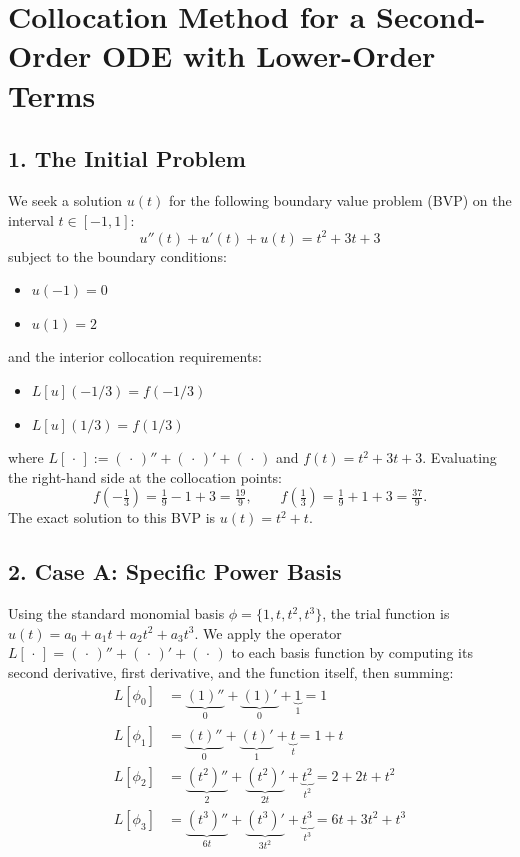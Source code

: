 \documentclass{article}
\begin{document}
\section*{Collocation Method for a Second-Order ODE with Lower-Order Terms}

\subsection*{1. The Initial Problem}
We seek a solution $u(t)$ for the following boundary value problem (BVP) on the interval $t \in [-1, 1]$:
\begin{equation}
    u''(t) + u'(t) + u(t) = t^2 + 3t + 3
\end{equation}
subject to the boundary conditions:
\begin{itemize}
    \item $u(-1) = 0$
    \item $u(1) = 2$
\end{itemize}
and the interior collocation requirements:
\begin{itemize}
    \item $L[u](-1/3) = f(-1/3)$
    \item $L[u](1/3) = f(1/3)$
\end{itemize}
where $L[\,\cdot\,] := (\,\cdot\,)'' + (\,\cdot\,)' + (\,\cdot\,)$ and $f(t) = t^2 + 3t + 3$.  Evaluating
the right-hand side at the collocation points:
\begin{equation}
    f\!\left(-\tfrac{1}{3}\right) = \tfrac{1}{9} - 1 + 3 = \tfrac{19}{9}, \qquad
    f\!\left(\tfrac{1}{3}\right)  = \tfrac{1}{9} + 1 + 3 = \tfrac{37}{9}.
\end{equation}
The exact solution to this BVP is $u(t) = t^2 + t$.

\subsection*{2. Case A: Specific Power Basis}
Using the standard monomial basis $\phi = \{1, t, t^2, t^3\}$, the trial function is
$u(t) = a_0 + a_1 t + a_2 t^2 + a_3 t^3$.
We apply the operator $L[\,\cdot\,] = (\,\cdot\,)'' + (\,\cdot\,)' + (\,\cdot\,)$ to each basis
function by computing its second derivative, first derivative, and the function itself, then summing:
\begin{align*}
    L[\phi_0]
        &= \underbrace{(1)''}_0 + \underbrace{(1)'}_0 + \underbrace{1}_{1}
         = 1 \\[4pt]
    L[\phi_1]
        &= \underbrace{(t)''}_0 + \underbrace{(t)'}_{1} + \underbrace{t}_{t}
         = 1 + t \\[4pt]
    L[\phi_2]
        &= \underbrace{(t^2)''}_{2} + \underbrace{(t^2)'}_{2t} + \underbrace{t^2}_{t^2}
         = 2 + 2t + t^2 \\[4pt]
    L[\phi_3]
        &= \underbrace{(t^3)''}_{6t} + \underbrace{(t^3)'}_{3t^2} + \underbrace{t^3}_{t^3}
         = 6t + 3t^2 + t^3
\end{align*}
\end{document}
